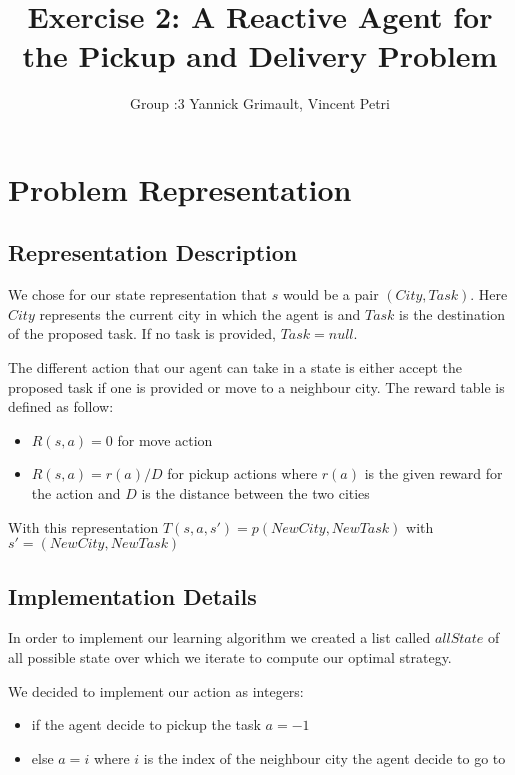 \documentclass[11pt]{article}
\title{\bf Exercise 2: A Reactive Agent for the Pickup and Delivery Problem}
\author{Group \textnumero:3 Yannick Grimault, Vincent Petri}
\begin{document}
\maketitle

\section{Problem Representation}

\subsection{Representation Description}

We chose for our state representation that $s$ would be a pair $(City,Task)$. Here $City$ represents the current city in which the agent is and $Task$ is the destination of the proposed task. If no task is provided, $Task = null$.

The different action that our agent can take in a state is either accept the proposed task if one is provided or move to a neighbour city. The reward table is defined as follow:
\begin{itemize}
\item $R(s,a)=0$ for move action
\item $R(s,a)=r(a)/D $ for pickup actions where $r(a)$ is the given reward for the action and $D$ is the distance between the two cities 
\end{itemize}

With this representation $T(s,a,s')=p(NewCity,NewTask)$ with $s'=(NewCity,NewTask)$

\subsection{Implementation Details}
In order to implement our learning algorithm we created a list called $allState$ of all possible state over which we iterate to compute our optimal strategy.

We decided to implement our action as integers:
\begin{itemize}
\item if the agent decide to pickup the task $a=-1$
\item else $a=i$ where $i$ is the index of the neighbour city the agent decide to go to
\end{itemize}
\end{document}
